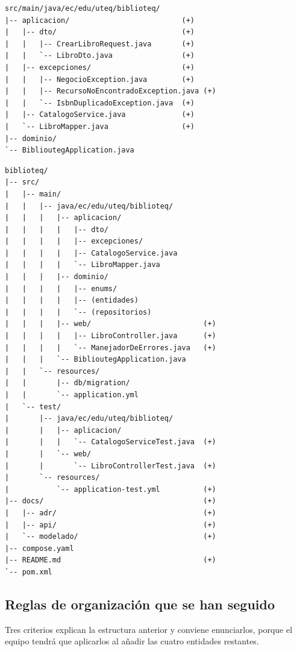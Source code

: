 \documentclass[11pt,a4paper,openany]{book}
\begin{document}
\begin{lstlisting}[style=plano,caption={Estado E3 --- tras la capa de aplicacion (capitulo 5).},label={lst:e3}]
src/main/java/ec/edu/uteq/biblioteq/
|-- aplicacion/                          (+)
|   |-- dto/                             (+)
|   |   |-- CrearLibroRequest.java       (+)
|   |   `-- LibroDto.java                (+)
|   |-- excepciones/                     (+)
|   |   |-- NegocioException.java        (+)
|   |   |-- RecursoNoEncontradoException.java (+)
|   |   `-- IsbnDuplicadoException.java  (+)
|   |-- CatalogoService.java             (+)
|   `-- LibroMapper.java                 (+)
|-- dominio/
`-- BiblioutegApplication.java
\end{lstlisting}

\begin{lstlisting}[style=plano,caption={Estado E4 --- estructura completa tras la capa web y las pruebas.},label={lst:e4}]
biblioteq/
|-- src/
|   |-- main/
|   |   |-- java/ec/edu/uteq/biblioteq/
|   |   |   |-- aplicacion/
|   |   |   |   |-- dto/
|   |   |   |   |-- excepciones/
|   |   |   |   |-- CatalogoService.java
|   |   |   |   `-- LibroMapper.java
|   |   |   |-- dominio/
|   |   |   |   |-- enums/
|   |   |   |   |-- (entidades)
|   |   |   |   `-- (repositorios)
|   |   |   |-- web/                          (+)
|   |   |   |   |-- LibroController.java      (+)
|   |   |   |   `-- ManejadorDeErrores.java   (+)
|   |   |   `-- BiblioutegApplication.java
|   |   `-- resources/
|   |       |-- db/migration/
|   |       `-- application.yml
|   `-- test/
|       |-- java/ec/edu/uteq/biblioteq/
|       |   |-- aplicacion/
|       |   |   `-- CatalogoServiceTest.java  (+)
|       |   `-- web/
|       |       `-- LibroControllerTest.java  (+)
|       `-- resources/
|           `-- application-test.yml          (+)
|-- docs/                                     (+)
|   |-- adr/                                  (+)
|   |-- api/                                  (+)
|   `-- modelado/                             (+)
|-- compose.yaml
|-- README.md                                 (+)
`-- pom.xml
\end{lstlisting}

\subsection{Reglas de organización que se han seguido}
\label{sec:reglas-organizacion}

Tres criterios explican la estructura anterior y conviene enunciarlos, porque el equipo tendrá que aplicarlos al añadir las cuatro entidades restantes.
\end{document}
